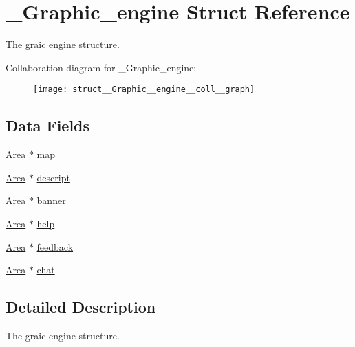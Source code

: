 \hypertarget{struct__Graphic__engine}{}\section{\+\_\+\+Graphic\+\_\+engine Struct Reference}
\label{struct__Graphic__engine}


The graic engine structure.  




Collaboration diagram for \+\_\+\+Graphic\+\_\+engine\+:\nopagebreak
\begin{figure}[H]
\begin{center}
\leavevmode
\texttt{[image: struct\_\_Graphic\_\_engine\_\_coll\_\_graph]}
\end{center}
\end{figure}
\subsection*{Data Fields}
\begin{DoxyCompactItemize}
\item 
\hyperlink{screen_8h_acfdfc42f6522d75fa3c16713afde8127}{Area} $\ast$ \hyperlink{struct__Graphic__engine_a1ea06bb881d335da8c31d63b3e834bdb}{map}
\item 
\hyperlink{screen_8h_acfdfc42f6522d75fa3c16713afde8127}{Area} $\ast$ \hyperlink{struct__Graphic__engine_a414bb888ecce3389c7ce348264758e58}{descript}
\item 
\hyperlink{screen_8h_acfdfc42f6522d75fa3c16713afde8127}{Area} $\ast$ \hyperlink{struct__Graphic__engine_a440dfb2c23c3c4b7d3871187371117b9}{banner}
\item 
\hyperlink{screen_8h_acfdfc42f6522d75fa3c16713afde8127}{Area} $\ast$ \hyperlink{struct__Graphic__engine_ade1d3e95ad6def427f613a4a2d101875}{help}
\item 
\hyperlink{screen_8h_acfdfc42f6522d75fa3c16713afde8127}{Area} $\ast$ \hyperlink{struct__Graphic__engine_a4fc0ef353d000b20d57fb75d898c6d2d}{feedback}
\item 
\hyperlink{screen_8h_acfdfc42f6522d75fa3c16713afde8127}{Area} $\ast$ \hyperlink{struct__Graphic__engine_a9aefefc40ce56ccf7dd9639a53cd5463}{chat}
\end{DoxyCompactItemize}


\subsection{Detailed Description}
The graic engine structure. 

